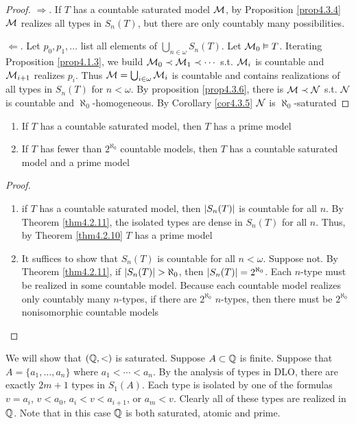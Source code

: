 \documentclass[11pt]{article}
\begin{document}
\begin{proof}
\(\Rightarrow\). If \(T\) has a countable saturated model \(\mathcal{M}\), by Proposition \ref{prop4.3.4} \(\mathcal{M}\)
realizes all types in \(S_n(T)\), but there are only countably many possibilities.

\(\Leftarrow\). Let \(p_0,p_1,\dots\) list all elements of \(\bigcup_{n\in\omega}S_n(T)\). Let \(\mathcal{M}_0\vDash T\). Iterating Proposition
\ref{prop4.1.3}, we build \(\mathcal{M}_0\prec\mathcal{M}_1\prec\cdots\) s.t. \(\mathcal{M}_i\) is countable and \(\mathcal{M}_{i+1}\) realizes \(p_i\).
Thus \(\mathcal{M}=\bigcup_{i\in\omega}\mathcal{M}_i\) is countable and contains realizations of all types in \(S_n(T)\)
for \(n<\omega\). By proposition \ref{prop4.3.6}, there is \(\mathcal{M}\prec\mathcal{N}\) s.t. \(\mathcal{N}\) is countable
and \(\aleph_0\)-homogeneous. By Corollary \ref{cor4.3.5} \(\mathcal{N}\) is \(\aleph_0\)-saturated
\end{proof}

\begin{corollary}[]
\label{cor4.3.8}
\begin{enumerate}
\item If \(T\) has a countable saturated model, then \(T\) has a prime model
\item If \(T\) has fewer than \(2^{\aleph_0}\) countable models, then \(T\) has a countable saturated
model and a prime model
\end{enumerate}
\end{corollary}

\begin{proof}
\begin{enumerate}
\item if \(T\) has a countable saturated model, then \(\abs{S_n(T)}\) is countable for all \(n\).
By Theorem \ref{thm4.2.11}, the isolated types are dense in \(S_n(T)\) for all \(n\). Thus, by
Theorem \ref{thm4.2.10} \(T\) has a prime model
\item It suffices to show that \(S_n(T)\) is countable for all \(n<\omega\). Suppose not. By Theorem
\ref{thm4.2.11}, if \(\abs{S_n(T)}>\aleph_0\), then \(\abs{S_n(T)}=2^{\aleph_0}\). Each \(n\)-type must
be realized in some countable model. Because each countable model realizes only countably
many \(n\)-types, if there are \(2^{\aleph_0}\) \(n\)-types, then there must be \(2^{\aleph_0}\)
nonisomorphic countable models
\end{enumerate}
\end{proof}

\begin{examplle}
We will show that \((\mathbb{Q},<)\) is saturated. Suppose \(A\subset\mathbb{Q}\) is finite. Suppose
that \(A=\{a_1,\dots,a_n\}\)  where \(a_1<\cdots<a_n\). By the analysis of types in DLO, there are
exactly \(2m+1\) types in \(S_1(A)\). Each type is isolated by one of the
formulas \(v=a_i\), \(v<a_0\), \(a_i<v<a_{i+1}\), or \(a_m<v\). Clearly all of these types are
realized in \(\mathbb{Q}\). Note that in this case \(\mathbb{Q}\) is both saturated, atomic and prime.
\end{examplle}
\end{document}
